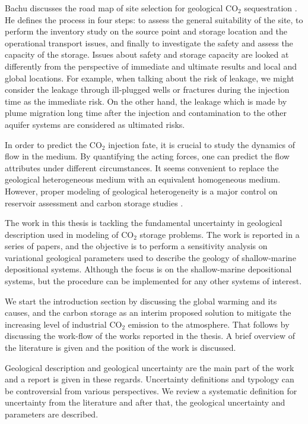 Bachu discusses the road map of site selection for geological $\mbox{CO}_2$ sequestration \cite{bachu2000sequestration}. He defines the process in four steps: to assess the general suitability of the site, to perform the inventory study on the source point and storage location and the operational transport issues, and finally to investigate the safety and assess the capacity of the storage. Issues about safety and storage capacity are looked at differently from the perspective of immediate and ultimate results and local and global locations. For example, when talking about the risk of leakage, we might consider the leakage through ill-plugged wells or fractures during the injection time as the immediate risk. On the other hand, the leakage which is made by plume migration long time after the injection and contamination to the other aquifer systems are considered as ultimated risks. 

In order to predict the $\mbox{CO}_2$ injection fate, it is crucial to study the dynamics of flow in the medium. By quantifying the acting forces, one can predict the flow attributes under different circumstances. It seems convenient to replace the geological heterogeneous medium with an equivalent homogeneous medium. However, proper modeling of geological heterogeneity is a major control on reservoir assessment and carbon storage studies \cite{eaton2006importance,bashore1993importance,melick2009incorporating,milliken2008effect}.

The work in this thesis is tackling the fundamental uncertainty in geological description used in modeling of $\mbox{CO}_2$ storage problems. The work is reported in a series of papers, and the objective is to perform a sensitivity analysis on variational geological parameters used to describe the geology of shallow-marine depositional systems. Although the focus is on the shallow-marine depositional systems, but the procedure can be implemented for any other systems of interest. 

We start the introduction section by discussing the global warming and its causes, and the carbon storage as an interim proposed solution to mitigate the increasing level of industrial $\mbox{CO}_2$ emission to the atmosphere. That follows by discussing the work-flow of the works reported in the thesis. A brief overview of the literature is given and the position of the work is discussed. 

Geological description and geological uncertainty are the main part of the work and a report is given in these regards. Uncertainty definitions and typology can be controversial from various perspectives. We review a systematic definition for uncertainty from the literature and after that, the geological uncertainty and parameters are described.

